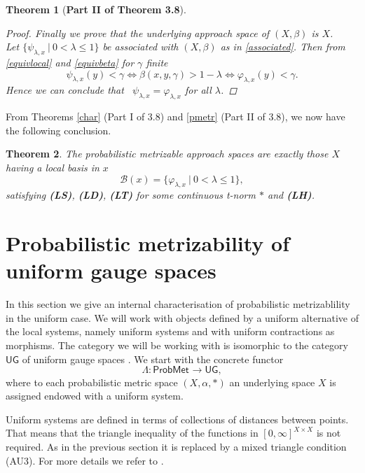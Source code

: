 \documentclass[12pt,a4paper]{amsart}
\theoremstyle{theorem}
\newtheorem{theorem}{Theorem}[section]
\theoremstyle{definition}
\newcommand{\bbb}{\ensuremath{\mathcal{B}}}
\newcommand{\PM}{\ensuremath{\mathsf{ProbMet_{}}}}
\newcommand{\ug}{\ensuremath{\mathsf{UG}}}
\renewcommand{\a}{\ensuremath{\alpha}}
\renewcommand{\b}{\ensuremath{\beta}}
\renewcommand{\l}{\ensuremath{\lambda}}
\def\rw{\rightarrow}
\begin{document}
{\begin{theorem} [\bf Part II of Theorem 3.8]
\begin{proof}
Finally we prove that the underlying approach space of $(X,\b)$ is $X$.\\
Let $\{\psi_{\l,x} \ | \ 0 < \l \leq 1 \}$ be associated with $(X,\b)$ as in \eqref{associated}. Then from \eqref{equivlocal}  and \ref{equivbeta} for $\gamma$ finite
$$
\psi_{\l,x}(y) < \gamma \Leftrightarrow \b(x,y, \gamma) > 1 - \l \Leftrightarrow \varphi_{\l,x}(y) < \gamma.
$$
Hence we can conclude that \ $\psi_{\l,x} = \varphi_{\l,x}$ for all $\l$. 
\end{proof}
\end{theorem}

From Theorems \ref{char} (Part I of 3.8) and \ref{pmetr}  (Part II of 3.8), we now have the following conclusion.

\begin{theorem}
The probabilistic metrizable approach spaces are exactly those $X$ having a local basis in $x$
$$
\bbb(x) = \{ \varphi_{\l,x} \ | \ 0  < \l \leq 1 \},
$$
satisfying {\bf(LS)}, {\bf(LD)}, {\bf(LT)} for some continuous t-norm $*$ and {\bf(LH)}. 
\end{theorem}



\section{Probabilistic metrizability of uniform gauge spaces}


In this section we give an internal characterisation of probabilistic metrizablility in the uniform case.  We will work with objects defined by a uniform alternative of the local systems, namely uniform systems \cite{LW} and with uniform contractions as morphisms. The category we will be working with is isomorphic to the category $\ug$ of uniform gauge spaces \cite{LOW}. 
We start with the concrete functor  \cite{CL}
\begin{equation}\label{concreteug}
\Lambda: \PM \rw \ug,
\end{equation}
where to each probabilistic metric space $(X, \a, *)$ an underlying space $X$ is assigned endowed with a uniform system.

Uniform systems are defined in terms of collections of distances between points.  That means that the triangle inequality of the functions in $[0,\infty] ^{X \times X}$ is not required. As in the previous section it is replaced by a mixed triangle condition (AU3).
For more details we refer to \cite{LW}.

}
\end{document}
